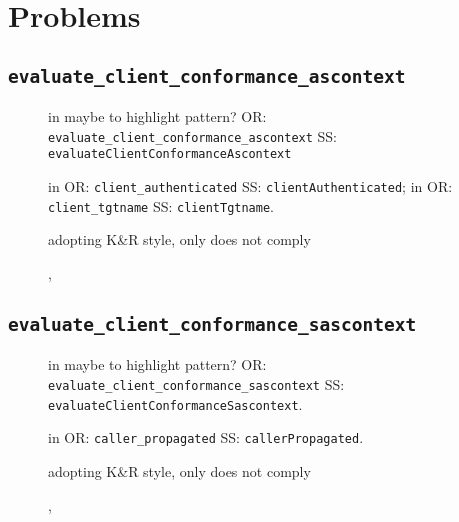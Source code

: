 \chapter{Problems}




\section{\normalfont\texttt{evaluate\_client\_conformance\_ascontext}}

\begin{description}
	\item []
		in  maybe to highlight pattern? 
			OR: \texttt{evaluate\_client\_conformance\_ascontext}
			SS: \texttt{evaluateClientConformanceAscontext}
	\item []
		in  
			OR: \texttt{client\_authenticated}
			SS: \texttt{clientAuthenticated}; 
		in  
			OR: \texttt{client\_tgtname}
			SS: \texttt{clientTgtname}.
	\item []
		adopting K\&R style, only  does not comply
	\item [] , 

\end{description}






\clearpage
\section{\normalfont\texttt{evaluate\_client\_conformance\_sascontext}}

\begin{description}
	\item [] 
		in  maybe to highlight pattern? 
			OR: \texttt{evaluate\_client\_conformance\_sascontext}
			SS: \texttt{evaluateClientConformanceSascontext}.
	\item [] 
		in  
			OR: \texttt{caller\_propagated}
			SS: \texttt{callerPropagated}.
	\item []
		adopting K\&R style, only  does not comply
	\item [] , 
\end{description}








